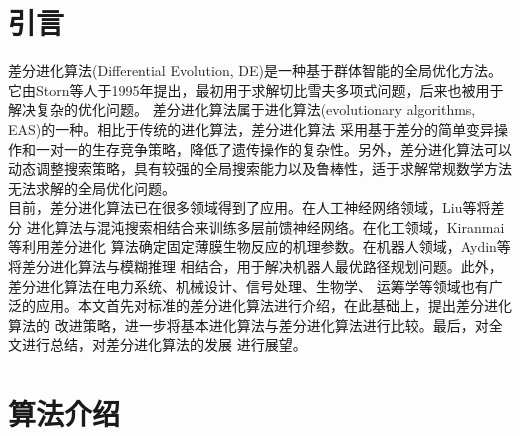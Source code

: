 \documentclass[a4paper,11pt,onecolumn,twoside]{article}
\begin{document}
\begin{CJK*}{GBK}{song}
\setlength{\oddsidemargin}{-.5cm}  %
\setlength{\evensidemargin}{\oddsidemargin}
\setlength{\textwidth}{17.00cm}

\begin{multicols}{2}
\section{引言}
\indent 差分进化算法(Differential Evolution, DE)\supercite{1,2}是一种基于群体智能的全局优化方法。
它由Storn等人于1995年提出，最初用于求解切比雪夫多项式问题，后来也被用于解决复杂的优化问题。
差分进化算法属于进化算法(evolutionary algorithms, EAS)的一种。相比于传统的进化算法，差分进化算法
采用基于差分的简单变异操作和一对一的生存竞争策略，降低了遗传操作的复杂性。另外，差分进化算法可以
动态调整搜索策略，具有较强的全局搜索能力以及鲁棒性，适于求解常规数学方法无法求解的全局优化问题。\\
\indent 目前，差分进化算法已在很多领域得到了应用。在人工神经网络领域，Liu等\supercite{3}将差分
进化算法与混沌搜索相结合来训练多层前馈神经网络。在化工领域，Kiranmai等\supercite{4}利用差分进化
算法确定固定薄膜生物反应的机理参数。在机器人领域，Aydin等\supercite{5}将差分进化算法与模糊推理
相结合，用于解决机器人最优路径规划问题。此外，差分进化算法在电力系统、机械设计、信号处理、生物学、
运筹学等领域也有广泛的应用。本文首先对标准的差分进化算法进行介绍，在此基础上，提出差分进化算法的
改进策略，进一步将基本进化算法与差分进化算法进行比较。最后，对全文进行总结，对差分进化算法的发展
进行展望。

\section{算法介绍}

\end{multicols}
\end{CJK*}
\end{document}
